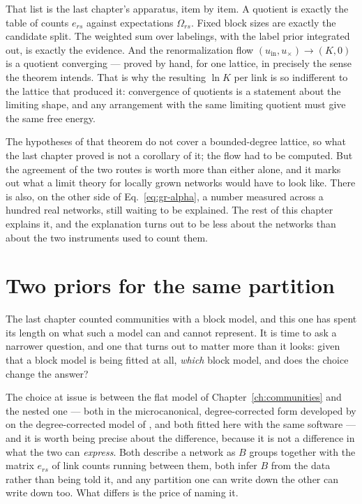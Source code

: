 That list is the last chapter's apparatus, item by item. A quotient is exactly the
table of counts $e_{rs}$ against expectations $\Omega_{rs}$. Fixed block sizes are
exactly the candidate split. The weighted sum over labelings, with the label prior
integrated out, is exactly the evidence. And the renormalization flow
$(u_{\mathrm{in}},u_\times)\to(K,0)$ is a quotient converging --- proved by hand,
for one lattice, in precisely the sense the theorem intends. That is why the
resulting $\ln K$ per link is so indifferent to the lattice that produced it:
convergence of quotients is a statement about the limiting shape, and any
arrangement with the same limiting quotient must give the same free energy.

The hypotheses of that theorem do not cover a bounded-degree lattice, so what the
last chapter proved is not a corollary of it; the flow had to be computed. But the
agreement of the two routes is worth more than either alone, and it marks out what
a limit theory for locally grown networks would have to look like. There is also,
on the other side of Eq.~\eqref{eq:gr-alpha}, a number measured across a hundred
real networks, still waiting to be explained. The rest of this chapter explains
it, and the explanation turns out to be less about the networks than about the
two instruments used to count them.

\section{Two priors for the same partition}
\label{sec:gr-twopriors}

The last chapter counted communities with a block model, and this one has spent
its length on what such a model can and cannot represent. It is time to ask a
narrower question, and one that turns out to matter more than it looks: given
that a block model is being fitted at all, \emph{which} block model, and does the
choice change the answer?

The choice at issue is between the flat model of Chapter~\ref{ch:communities} and
the nested one --- both in the microcanonical, degree-corrected form developed by
\citet{peixoto2014mcmc,peixoto2019bayesian} on the degree-corrected model of
\citet{karrer2011}, and both fitted here with the same software --- and it is
worth being precise about the difference, because it is
not a difference in what the two can \emph{express}. Both describe a network as
$B$ groups together with the matrix $e_{rs}$ of link counts running between them,
both infer $B$ from the data rather than being told it, and any partition one can
write down the other can write down too. What differs is the price of naming it.

